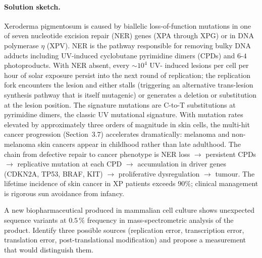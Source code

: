\paragraph{Solution sketch.} Xeroderma pigmentosum is caused by
biallelic loss-of-function mutations in one of seven nucleotide
excision repair (NER) genes (XPA through XPG) or in DNA polymerase
$\eta$ (XPV). NER is the pathway responsible for removing bulky DNA
adducts including UV-induced cyclobutane pyrimidine dimers (CPDs)
and $6$-$4$ photoproducts. With NER absent, every $\sim 10^4$ UV-
induced lesions per cell per hour of solar exposure persist into
the next round of replication; the replication fork encounters the
lesion and either stalls (triggering an alternative trans-lesion
synthesis pathway that is itself mutagenic) or generates a deletion
or substitution at the lesion position. The signature mutations
are C-to-T substitutions at pyrimidine dimers, the classic UV
mutational signature. With mutation rates elevated by approximately
three orders of magnitude in skin cells, the multi-hit cancer
progression (Section~3.7) accelerates dramatically: melanoma and
non-melanoma skin cancers appear in childhood rather than late
adulthood. The chain from defective repair to cancer phenotype is
NER loss $\to$ persistent CPDs $\to$ replicative mutation at each
CPD $\to$ accumulation in driver genes (CDKN2A, TP53, BRAF, KIT)
$\to$ proliferative dysregulation $\to$ tumour. The lifetime
incidence of skin cancer in XP patients exceeds $90\%$; clinical
management is rigorous sun avoidance from infancy.

\begin{exercise}
A new biopharmaceutical produced in mammalian cell culture shows
unexpected sequence variants at $0.5\,\%$ frequency in mass-spectrometric
analysis of the product. Identify three possible sources (replication
error, transcription error, translation error, post-translational
modification) and propose a measurement that would distinguish them.
\end{exercise}

